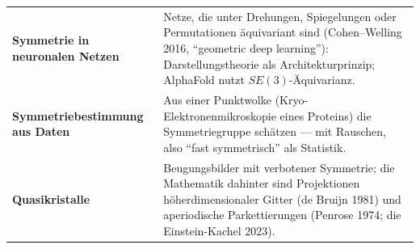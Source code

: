 \begin{forschung}
\begin{center}
{\small
\renewcommand{\arraystretch}{1.45}
\begin{tabular}{@{}P{3.0cm}P{5.2cm}@{}}
\toprule
\textbf{Symmetrie in neuronalen Netzen} & Netze, die unter Drehungen, Spiegelungen oder Permutationen äquivariant sind (Cohen--Welling 2016, \enquote{geometric deep learning}): Darstellungstheorie als Architekturprinzip; AlphaFold nutzt $SE(3)$-Äquivarianz.\\
\textbf{Symmetrie\-bestimmung aus Daten} & Aus einer Punktwolke (Kryo-Elektronenmikroskopie eines Proteins) die Symmetriegruppe schätzen --- mit Rauschen, also \enquote{fast symmetrisch} als Statistik.\\
\textbf{Quasikristalle} & Beugungsbilder mit verbotener Symmetrie; die Mathematik dahinter sind Projektionen höherdimensionaler Gitter (de Bruijn 1981) und aperiodische Parkettierungen (Penrose 1974; die Einstein-Kachel 2023).\\
\bottomrule
\end{tabular}}
\end{center}

\begin{center}
\begin{minipage}{0.88\textwidth}
\end{minipage}
\end{center}
\end{forschung}

